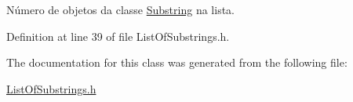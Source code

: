 Número de objetos da classe \hyperlink{classSubstring}{Substring} na lista. 



Definition at line 39 of file List\+Of\+Substrings.\+h.



The documentation for this class was generated from the following file\+:\begin{DoxyCompactItemize}
\item 
\hyperlink{ListOfSubstrings_8h}{List\+Of\+Substrings.\+h}\end{DoxyCompactItemize}
